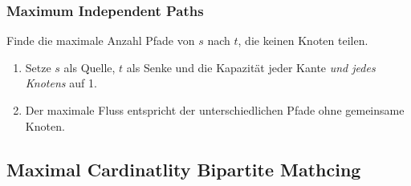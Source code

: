 \subsubsection{Maximum Independent Paths}
Finde die maximale Anzahl Pfade von $s$ nach $t$, die keinen Knoten teilen.
\begin{enumerate}
	\item Setze $s$ als Quelle, $t$ als Senke und die Kapazität jeder Kante \emph{und jedes Knotens} auf 1.
	\item Der maximale Fluss entspricht der unterschiedlichen Pfade ohne gemeinsame Knoten.
\end{enumerate}

\subsection{Maximal Cardinatlity Bipartite Mathcing}



